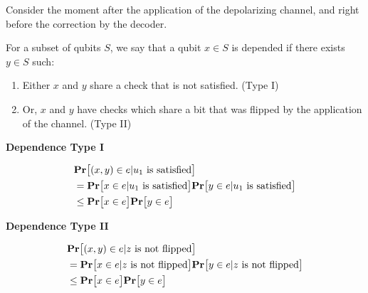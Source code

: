  \begin{definition}
Consider the moment after the application of the depolarizing channel, and right before the correction by the decoder.

For a subset of qubits $S$, we say that a qubit $x \in S$ is depended if there exists $y \in S$ such:
\begin{enumerate}
  \item Either $x$ and $y$ share a check that is not satisfied. (Type I)  
  \item Or, $x$ and $y$ have checks which share a bit that was flipped by the application of the channel. (Type II)
\end{enumerate}
  \end{definition}


  
  \textbf{Dependence Type I}
  \begin{figure}[h]
  \end{figure}

  \begin{align*}
    & \mathbf{Pr} \big[  (x,y) \in e | u_{1} \text{ is satisfied}  \big]  \\
    & = \mathbf{Pr} \big[  x \in e | u_{1} \text{ is satisfied}   \big]  \mathbf{Pr} \big[  y \in e | u_{1} \text{ is satisfied}   \big] \\ 
    & \le \mathbf{Pr} \big[  x \in e  \big]\mathbf{Pr} \big[  y \in e  \big]
  \end{align*}


  \textbf{Dependence Type II}
  \begin{figure}[h]
  \end{figure}

  \begin{align*}
    & \mathbf{Pr} \big[  (x,y) \in e | z \text{ is not flipped}  \big]  \\
    & = \mathbf{Pr} \big[  x \in e | z \text{ is not flipped}  \big]  \mathbf{Pr} \big[  y \in e | z \text{ is not flipped}  \big] \\ 
    & \le \mathbf{Pr} \big[  x \in e  \big]\mathbf{Pr} \big[  y \in e  \big]
  \end{align*}


